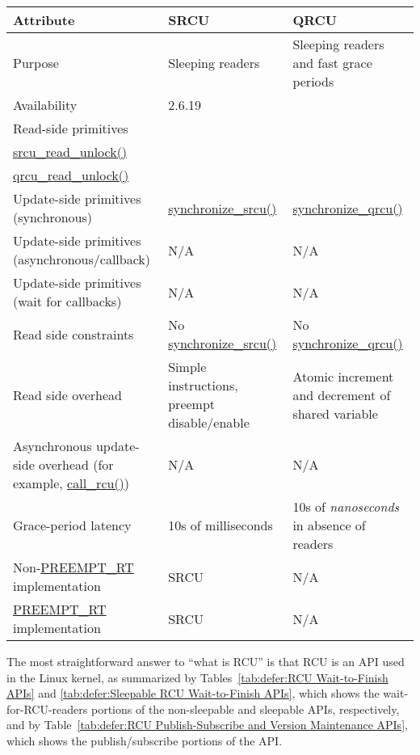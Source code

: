 \begin{table*}[p]
\begin{center}
\scriptsize
\begin{tabular}{p{1.1in}|p{1.5in}|p{1.5in}}
Attribute &
    SRCU &
	QRCU \\
\hline
\hline
Purpose &
    Sleeping readers &
	Sleeping readers and fast grace periods \\
\hline
Availability &
    2.6.19 &
	\\
\hline
Read-side primitives &
    { \raggedright
      \url{srcu_read_lock()} \\
      \url{srcu_read_unlock()} } &
	{ \raggedright
	  \url{qrcu_read_lock()} \\
	  \url{qrcu_read_unlock()} } \\
\hline
{ Update-side primitives (synchronous) } &
    \url{synchronize_srcu()} &
	\url{synchronize_qrcu()} \\
\hline
{ Update-side primitives (asynchronous/callback) } &
    N/A &
	N/A \\
\hline
{ Update-side primitives (wait for callbacks) } &
    N/A &
	N/A \\
\hline
Read side constraints &
    No \url{synchronize_srcu()} &
	No \url{synchronize_qrcu()} \\
\hline
Read side overhead &
    Simple instructions, preempt disable/enable &
	Atomic increment and decrement of shared variable \\
\hline
Asynchronous update-side overhead (for example, \url{call_rcu()}) &
    N/A &
	N/A \\
\hline
Grace-period latency &
    10s of milliseconds &
	10s of \emph{nanoseconds} in absence of readers \\
\hline
Non-\url{PREEMPT_RT} implementation &
    SRCU &
	N/A \\
\hline
\url{PREEMPT_RT} implementation &
    SRCU &
	N/A \\
\end{tabular}
\end{center}
\caption{Sleepable RCU Wait-to-Finish APIs}
\label{tab:defer:Sleepable RCU Wait-to-Finish APIs}
\end{table*}

The most straightforward answer to ``what is RCU'' is that RCU is
an API used in the Linux kernel, as summarized by
Tables~\ref{tab:defer:RCU Wait-to-Finish APIs} and
\ref{tab:defer:Sleepable RCU Wait-to-Finish APIs},
which shows the wait-for-RCU-readers portions of the non-sleepable and
sleepable APIs, respectively,
and by
Table~\ref{tab:defer:RCU Publish-Subscribe and Version Maintenance APIs},
which shows the publish/subscribe portions of the API.

